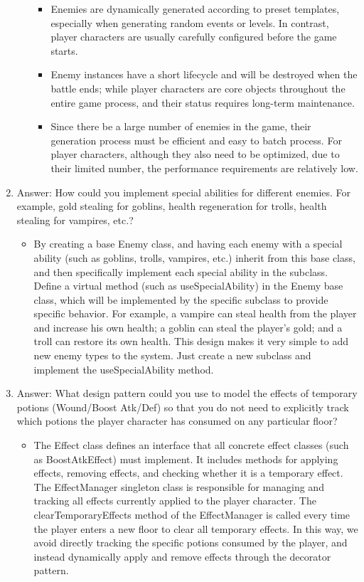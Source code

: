 \documentclass{article}
\begin{document}
\begin{enumerate}
\begin{itemize}
\begin{itemize}
                \item Enemies are dynamically generated according to preset templates, especially when generating random events or levels. In contrast, player characters are usually carefully configured before the game starts.
                \item Enemy instances have a short lifecycle and will be destroyed when the battle ends; while player characters are core objects throughout the entire game process, and their status requires long-term maintenance.
                \item Since there be a large number of enemies in the game, their generation process must be efficient and easy to batch process. For player characters, although they also need to be optimized, due to their limited number, the performance requirements are relatively low.
            \end{itemize}
        \end{itemize}
    \item Answer: How could you implement special abilities for different enemies. For example, gold stealing for goblins, health regeneration for trolls, health stealing for vampires, etc.?
    \begin{itemize}
        \item By creating a base Enemy class, and having each enemy with a special ability (such as goblins, trolls, vampires, etc.) inherit from this base class, and then specifically implement each special ability in the subclass. Define a virtual method (such as useSpecialAbility) in the Enemy base class, which will be implemented by the specific subclass to provide specific behavior. For example, a vampire can steal health from the player and increase his own health; a goblin can steal the player's gold; and a troll can restore its own health. This design makes it very simple to add new enemy types to the system. Just create a new subclass and implement the useSpecialAbility method.
    \end{itemize}
    \item Answer: What design pattern could you use to model the effects of temporary potions (Wound/Boost Atk/Def) so that you do not need to explicitly track which potions the player character has consumed on any particular floor?
    \begin{itemize}
        \item The Effect class defines an interface that all concrete effect classes (such as BoostAtkEffect) must implement. It includes methods for applying effects, removing effects, and checking whether it is a temporary effect. The EffectManager singleton class is responsible for managing and tracking all effects currently applied to the player character. The clearTemporaryEffects method of the EffectManager is called every time the player enters a new floor to clear all temporary effects. In this way, we avoid directly tracking the specific potions consumed by the player, and instead dynamically apply and remove effects through the decorator pattern.

\end{itemize}
\end{enumerate}
\end{document}
